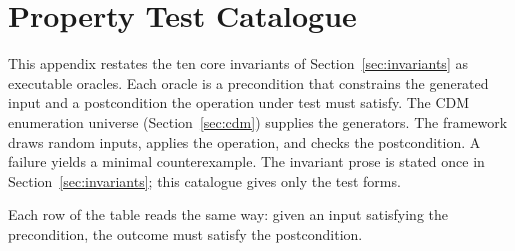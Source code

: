 \section{Property Test Catalogue}
\label{app:properties}

This appendix restates the ten core invariants of Section~\ref{sec:invariants} as executable oracles. Each oracle is a precondition that constrains the generated input and a postcondition the operation under test must satisfy. The CDM enumeration universe (Section~\ref{sec:cdm}) supplies the generators. The framework draws random inputs, applies the operation, and checks the postcondition. A failure yields a minimal counterexample. The invariant prose is stated once in Section~\ref{sec:invariants}; this catalogue gives only the test forms.

Each row of the table reads the same way: given an input satisfying the precondition, the outcome must satisfy the postcondition.

